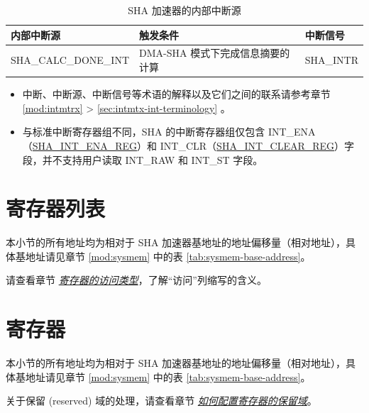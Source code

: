 \documentclass[main\_\_CN.tex]{subfiles}
\begin{document}
\begin{longtable}{ | L{5cm} | L{6.5cm} | L{4cm} | }
\caption{SHA 加速器的内部中断源} \label{tab:sha-int-sources}
\\ \hline
{}
\textbf{内部中断源} & \textbf{触发条件}  &  \textbf{中断信号}\\ \hline
\label{int:SHACALCDONEINT}SHA\_CALC\_DONE\_INT  &  DMA-SHA 模式下完成信息摘要的计算 &  SHA\_INTR  \\ \hline
\end{longtable}

\begin{tiplisting}
\vspace{-2.5em}
\begin{itemize}
    \item 中断、中断源、中断信号等术语的解释以及它们之间的联系请参考章节 \ref{mod:intmtrx} \textit{} > \ref{sec:intmtx-int-terminology} \textit{}。
    \item 与标准中断寄存器组不同，SHA 的中断寄存器组仅包含 INT\_ENA（\hyperref[regdesc:SHAINTENAREG]{SHA\_INT\_ENA\_REG}）和 INT\_CLR（\hyperref[regdesc:SHAINTCLEARREG]{SHA\_INT\_CLEAR\_REG}）字段，并不支持用户读取 INT\_RAW 和 INT\_ST 字段。
\end{itemize}
\end{tiplisting}





\newpage
\hypertarget{sha-reg-summ}{}
\section{寄存器列表}
\label{sec:sha-reg-summ}


本小节的所有地址均为相对于 SHA 加速器基地址的地址偏移量（相对地址），具体基地址请见章节 \ref{mod:sysmem} \textit{} 中的表 \ref{tab:sysmem-base-address}。

请查看章节 \hyperref[glossary-access-types]{\textit{寄存器的访问类型}}，了解“访问”列缩写的含义。






\newpage
\section{寄存器}

本小节的所有地址均为相对于 SHA 加速器基地址的地址偏移量（相对地址），具体基地址请见章节 \ref{mod:sysmem} \textit{} 中的表 \ref{tab:sysmem-base-address}。

关于保留 (reserved) 域的处理，请查看章节 \hyperref[programming-reserved-field]{\textit{如何配置寄存器的保留域}}。


\end{document}
